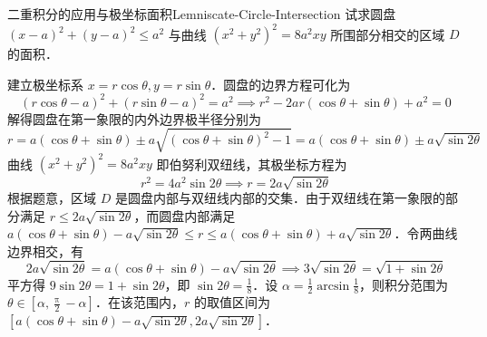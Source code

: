 \begin{problem}{二重积分的应用与极坐标面积}{Lemniscate-Circle-Intersection}
    试求圆盘 $(x-a)^2 + (y-a)^2 \le a^2$ 与曲线 $(x^2 + y^2)^2 = 8a^2 xy$ 所围部分相交的区域 $D$ 的面积．
\end{problem}

\begin{solution}
    建立极坐标系 $x = r \cos \theta, y = r \sin \theta$．圆盘的边界方程可化为
    \begin{equation}
        (r \cos \theta - a)^2 + (r \sin \theta - a)^2 = a^2 \implies r^2 - 2ar(\cos \theta + \sin \theta) + a^2 = 0
    \end{equation}
    解得圆盘在第一象限的内外边界极半径分别为
    \begin{equation}
        r = a(\cos \theta + \sin \theta) \pm a \sqrt{(\cos \theta + \sin \theta)^2 - 1} = a(\cos \theta + \sin \theta) \pm a \sqrt{\sin 2\theta}
    \end{equation}
    曲线 $(x^2 + y^2)^2 = 8a^2 xy$ 即伯努利双纽线，其极坐标方程为
    \begin{equation}
        r^2 = 4a^2 \sin 2\theta \implies r = 2a \sqrt{\sin 2\theta}
    \end{equation}
    根据题意，区域 $D$ 是圆盘内部与双纽线内部的交集．由于双纽线在第一象限的部分满足 $r \le 2a\sqrt{\sin 2\theta}$，而圆盘内部满足 $a(\cos \theta + \sin \theta) - a \sqrt{\sin 2\theta} \le r \le a(\cos \theta + \sin \theta) + a \sqrt{\sin 2\theta}$．令两曲线边界相交，有
    \begin{equation}
        2a\sqrt{\sin 2\theta} = a(\cos \theta + \sin \theta) - a\sqrt{\sin 2\theta} \implies 3\sqrt{\sin 2\theta} = \sqrt{1 + \sin 2\theta}
    \end{equation}
    平方得 $9\sin 2\theta = 1 + \sin 2\theta$，即 $\sin 2\theta = \frac{1}{8}$．设 $\alpha = \frac{1}{2} \arcsin \frac{1}{8}$，则积分范围为 $\theta \in [\alpha, \frac{\uppi}{2} - \alpha]$．在该范围内，$r$ 的取值区间为 $[a(\cos \theta + \sin \theta) - a\sqrt{\sin 2\theta}, 2a\sqrt{\sin 2\theta}]$．


\end{solution}
